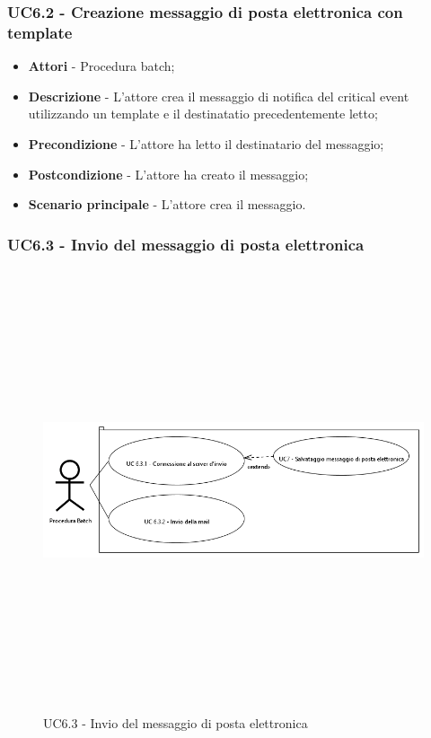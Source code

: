                 \subsubsection{UC6.2 - Creazione messaggio di posta elettronica con template}

                    \begin{itemize}

                        \item \textbf{Attori} - Procedura batch;
                        \item \textbf{Descrizione} - L'attore crea il messaggio di notifica del critical event utilizzando un
                        template e il destinatatio precedentemente letto;
                        \item \textbf{Precondizione} - L'attore ha letto il destinatario del messaggio;
                        \item \textbf{Postcondizione} - L'attore ha creato il messaggio;
                        \item \textbf{Scenario principale} - L'attore crea il messaggio.

                    \end{itemize}

                \subsubsection{UC6.3 - Invio del messaggio di posta elettronica}

                    \begin{figure}[H]
                        \centering
                        \includegraphics[width=13cm,height=13cm,keepaspectratio]{./images/UC6_3.png}
                        \caption{UC6.3 - Invio del messaggio di posta elettronica}
                    \end{figure}

